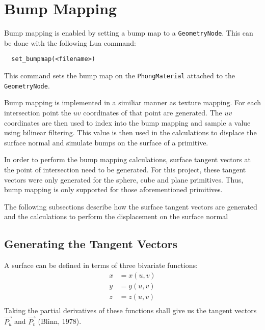 \section{Bump Mapping}

Bump mapping is enabled by setting a bump map to a \verb|GeometryNode|. This can
be done with the following Lua command:
\begin{lstlisting}
  set_bumpmap(<filename>)
\end{lstlisting}
This command sets the bump map on the \verb|PhongMaterial| attached to the
\verb|GeometryNode|.

Bump mapping is implemented in a similiar manner as texture mapping. For each
intersection point the $uv$ coordinates of that point are generated. The $uv$
coordinates are then used to index into the bump mapping and sample a value
using bilinear filtering. This value is then used in the calculations to
displace the surface normal and simulate bumps on the surface of a primitive.

In order to perform the bump mapping calculations, surface tangent vectors at
the point of intersection need to be generated. For this project, these tangent
vectors were only generated for the sphere, cube and plane primitives. Thus,
bump mapping is only supported for those aforementioned primitives.

The following subsections describe how the surface tangent vectors are generated
and the calculations to perform the displacement on the surface normal

\subsection{Generating the Tangent Vectors}
A surface can be defined in terms of three bivariate functions:
\begin{equation}
\begin{split}
  x &= x(u, v) \\
  y &= y(u, v) \\
  z &= z(u, v) \\
\end{split}
\end{equation}
Taking the partial derivatives of these functions shall give us the tangent
vectors $\vec{P_{u}}$ and $\vec{P_{v}}$ (Blinn, 1978).

